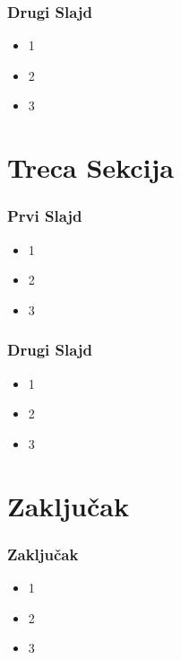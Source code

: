 \documentclass{beamer}
\begin{document}
\begin{frame}
  \frametitle{Drugi Slajd}
  \begin{itemize}
    \item  1
    \item  2
    \item  3
  \end{itemize}
\end{frame}

\section{Treca Sekcija}

\begin{frame}
  \frametitle{Prvi Slajd}
  \begin{itemize}
    \item  1
    \item  2
    \item  3
  \end{itemize}
\end{frame}

\begin{frame}
  \frametitle{Drugi Slajd}
  \begin{itemize}
    \item  1
    \item  2
    \item  3
  \end{itemize}
\end{frame}

\section{Zaključak}

\begin{frame}
  \frametitle{Zaključak}
  \begin{itemize}
    \item  1
    \item  2
    \item  3
  \end{itemize}
\end{frame}
\end{document}
